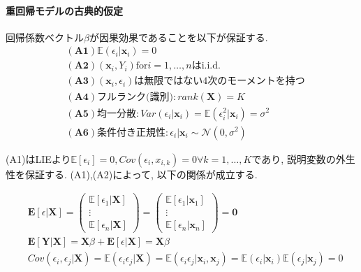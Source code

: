 \documentclass[paper=a4paper,fontsize=10pt]{jlreq}
\begin{document}
\paragraph{重回帰モデルの古典的仮定}
回帰係数ベクトル$\beta$が因果効果であることを以下が保証する. 
\begin{align*}
  &\mathbf{(A1)}　 \mathbb{E}(\epsilon_i|\mathbf{x}_{i})=0\\
  &\mathbf{(A2)}　 (\mathbf{x}_{i}, Y_{i})　\text{for}　i=1, \dots, n　\text{はi.i.d.}\\
  &\mathbf{(A3)}　 (\mathbf{x}_{i}, \epsilon_{i})\text{は無限ではない4次のモーメントを持つ}\\
  &\mathbf{(A4)}　 \text{フルランク(識別)}: rank(\mathbf{X})=K\\
  &\mathbf{(A5)}　 \text{均一分散}: Var(\epsilon_i|\mathbf{x}_{i})=\mathbb{E}(\epsilon_i^2|\mathbf{x}_{i})=\sigma^{2}\\
  &\mathbf{(A6)}　 条件付き正規性: \epsilon_i|\mathbf{x}_{i} \sim \mathcal{N} (0, \sigma^{2})
\end{align*}

(A1)はLIEより$\mathbb{E}[\epsilon_i]=0, Cov(\epsilon_i, x_{i,k})=0\forall k=1,\dots,K$であり, 説明変数の外生性を保証する. (A1),(A2)によって, 以下の関係が成立する.

\begin{align*}
  &\mathbf{E}[\epsilon | \mathbf{X}] = 
  \begin{pmatrix} 
    \mathbb{E}[\epsilon_1 |\mathbf{X}] \\ \vdots \\ \mathbb{E}[\epsilon_n |\mathbf{X}] 
  \end{pmatrix} 
  = 
  \begin{pmatrix} 
    \mathbb{E}[\epsilon_1 |\mathbf{x}_1] \\ \vdots \\ \mathbb{E}[\epsilon_n |\mathbf{x}_n] 
  \end{pmatrix} 
  = \mathbf{0}\\
  &\mathbf{E[Y|X]}=\mathbf{X}\beta + \mathbf{E}[\epsilon | \mathbf{X}] = \mathbf{X}\beta\\
  &Cov(\epsilon_i, \epsilon_j | \mathbf{X})=\mathbb{E}(\epsilon_i \epsilon_j | \mathbf{X})=\mathbb{E}(\epsilon_i \epsilon_j | \mathbf{x}_i, \mathbf{x}_j)=\mathbb{E}(\epsilon_i | \mathbf{x}_i) \mathbb{E}(\epsilon_j |\mathbf{x}_j)=0
\end{align*}
\end{document}
